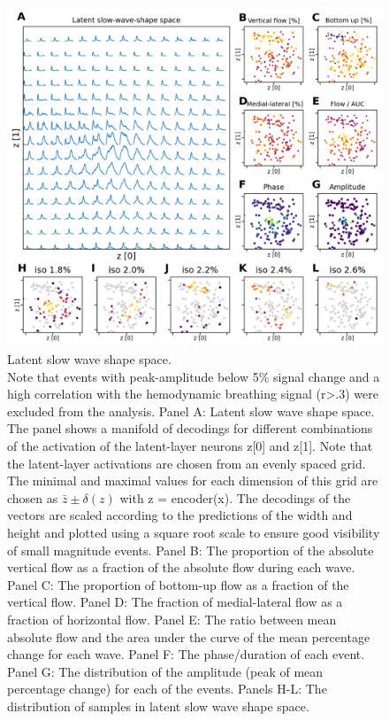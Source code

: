 \begin{figure}[!htb]
\centering
\includegraphics[width=\textwidth,height=\textheight,keepaspectratio]{Figures/slow_wave_shape_space}
\decoRule
\caption[Latent slow wave shape space]{Latent slow wave shape space.\\Note that events with peak-amplitude below 5\% signal change and a high correlation with the hemodynamic breathing signal (r>.3) were excluded from the analysis. Panel A: Latent slow wave shape space. The panel shows a manifold of decodings for different combinations of the activation of the latent-layer neurons z[0] and z[1]. Note that the latent-layer activations are chosen from an evenly spaced grid. The minimal and maximal values for each dimension of this grid are chosen as $\bar{z}\pm\delta\left(z\right)$ with z = encoder(x). The decodings of the vectors are scaled according to the predictions of the width and height and plotted using a square root scale to ensure good visibility of small magnitude events. Panel B: The proportion of the absolute vertical flow as a fraction of the absolute flow during each wave. Panel C: The proportion of bottom-up flow as a fraction of the vertical flow. Panel D: The fraction of medial-lateral flow as a fraction of horizontal flow. Panel E: The ratio between mean absolute flow and the area under the curve of the mean percentage change for each wave. Panel F: The phase/duration of each event. Panel G: The distribution of the amplitude (peak of mean percentage change) for each of the events. Panels H-L: The distribution of samples in latent slow wave shape space.}
\label{fig:slow_wave_shape_space}
\end{figure}
